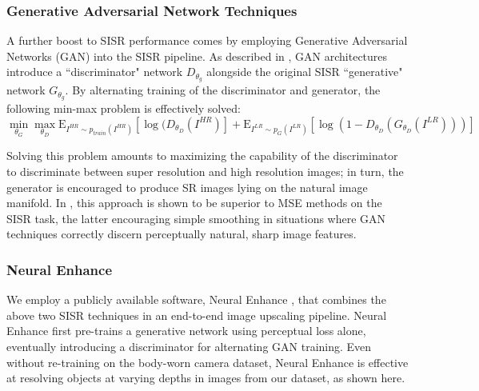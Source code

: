 \documentclass[a4paper]{article}
\begin{document}
\subsubsection{Generative Adversarial Network Techniques}
A further boost to SISR performance comes by employing Generative Adversarial Networks (GAN) into the SISR pipeline. As described in \cite{PerceptualGAN}, GAN architectures introduce a ``discriminator" network $D_{\theta_g}$ alongside the original SISR ``generative" network $G_{\theta_g}$. By alternating training of the discriminator and generator, the following min-max problem is effectively solved:
$$\min_{\theta_G} \max_{\theta_D} \mathrm{E}_{I^{HR} \sim p_{train}(I^{HR})}[\log(D_{\theta_D}(I^{HR})] 
	+ \mathrm{E}_{I^{LR} \sim p_{G}(I^{LR})}[\log(1-D_{\theta_D}(G_{\theta_D}(I^{LR})))]$$
    
Solving this problem amounts to maximizing the capability of the discriminator to discriminate between super resolution and high resolution images; in turn, the generator is encouraged to produce SR images lying on the natural image manifold. In \cite{PerceptualGAN}, this approach is shown to be superior to MSE methods on the SISR task, the latter encouraging simple smoothing in situations where GAN techniques correctly discern perceptually natural, sharp image features.
\subsubsection{Neural Enhance}
We employ a publicly available software, Neural Enhance \cite{github}, that combines the above two SISR techniques in an end-to-end image upscaling pipeline. Neural Enhance first pre-trains a generative network using perceptual loss alone, eventually introducing a discriminator for alternating GAN training. Even without re-training on the body-worn camera dataset, Neural Enhance is effective at resolving objects at varying depths in images from our dataset, as shown here.
\end{document}
